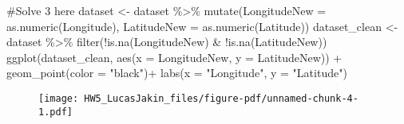 \documentclass[
  letterpaper,
  DIV=11,
  numbers=noendperiod]{scrartcl}
\newenvironment{Shaded}{\begin{snugshade}}{\end{snugshade}}
\newcommand{\AttributeTok}[1]{\textcolor[rgb]{0.40,0.45,0.13}{#1}}
\newcommand{\CommentTok}[1]{\textcolor[rgb]{0.37,0.37,0.37}{#1}}
\newcommand{\FunctionTok}[1]{\textcolor[rgb]{0.28,0.35,0.67}{#1}}
\newcommand{\NormalTok}[1]{\textcolor[rgb]{0.00,0.23,0.31}{#1}}
\newcommand{\OtherTok}[1]{\textcolor[rgb]{0.00,0.23,0.31}{#1}}
\newcommand{\SpecialCharTok}[1]{\textcolor[rgb]{0.37,0.37,0.37}{#1}}
\newcommand{\StringTok}[1]{\textcolor[rgb]{0.13,0.47,0.30}{#1}}
\begin{document}
\begin{Shaded}
\begin{Highlighting}[]
\CommentTok{\#Solve 3 here}
\NormalTok{dataset }\OtherTok{\textless{}{-}}\NormalTok{ dataset }\SpecialCharTok{\%\textgreater{}\%} \FunctionTok{mutate}\NormalTok{(}\AttributeTok{LongitudeNew =} \FunctionTok{as.numeric}\NormalTok{(Longitude),}
                              \AttributeTok{LatitudeNew =} \FunctionTok{as.numeric}\NormalTok{(Latitude))}
\NormalTok{dataset\_clean }\OtherTok{\textless{}{-}}\NormalTok{ dataset }\SpecialCharTok{\%\textgreater{}\%} \FunctionTok{filter}\NormalTok{(}\SpecialCharTok{!}\FunctionTok{is.na}\NormalTok{(LongitudeNew) }\SpecialCharTok{\&} \SpecialCharTok{!}\FunctionTok{is.na}\NormalTok{(LatitudeNew))}
\FunctionTok{ggplot}\NormalTok{(dataset\_clean, }\FunctionTok{aes}\NormalTok{(}\AttributeTok{x =}\NormalTok{ LongitudeNew, }\AttributeTok{y =}\NormalTok{ LatitudeNew)) }\SpecialCharTok{+}
  \FunctionTok{geom\_point}\NormalTok{(}\AttributeTok{color =} \StringTok{"black"}\NormalTok{)}\SpecialCharTok{+}
  \FunctionTok{labs}\NormalTok{(}\AttributeTok{x =} \StringTok{"Longitude"}\NormalTok{,}
       \AttributeTok{y =} \StringTok{"Latitude"}\NormalTok{)}
\end{Highlighting}
\end{Shaded}

\begin{figure}[H]

{\centering \texttt{[image: HW5\_LucasJakin\_files/figure-pdf/unnamed-chunk-4-1.pdf]}

}

\end{figure}
\end{document}

